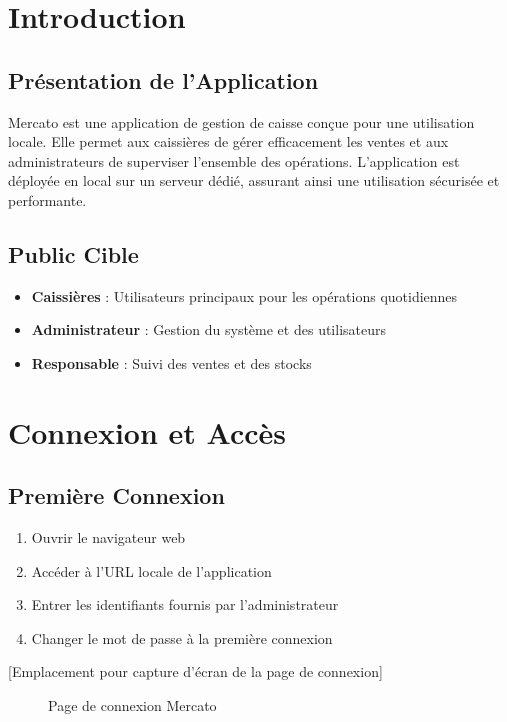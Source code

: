 \documentclass[14pt,a4paper]{report}
\begin{document}
\tableofcontents
\newpage

\chapter{Introduction}

\section{Présentation de l'Application}
Mercato est une application de gestion de caisse conçue pour une utilisation locale. Elle permet aux caissières de gérer efficacement les ventes et aux administrateurs de superviser l'ensemble des opérations. L'application est déployée en local sur un serveur dédié, assurant ainsi une utilisation sécurisée et performante.

\section{Public Cible}
\begin{itemize}
    \item \textbf{Caissières} : Utilisateurs principaux pour les opérations quotidiennes
    \item \textbf{Administrateur} : Gestion du système et des utilisateurs
    \item \textbf{Responsable} : Suivi des ventes et des stocks
\end{itemize}

\chapter{Connexion et Accès}

\section{Première Connexion}
\begin{enumerate}
    \item Ouvrir le navigateur web
    \item Accéder à l'URL locale de l'application
    \item Entrer les identifiants fournis par l'administrateur
    \item Changer le mot de passe à la première connexion
\end{enumerate}

[Emplacement pour capture d'écran de la page de connexion]
\begin{figure}[H]
    \caption{Page de connexion Mercato}
\end{figure}
\end{document}
